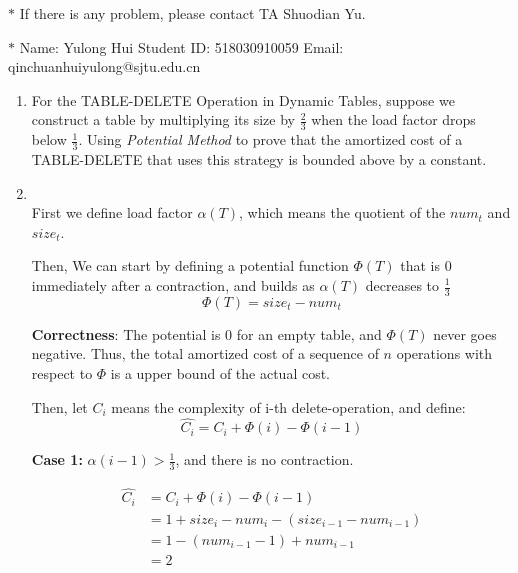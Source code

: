 \documentclass[12pt,a4paper]{article}
\makeatletter
\newtheorem*{solution}{Solution}
\theoremstyle{definition}
\renewenvironment{solution}[1][Solution] {\par\pushQED{\qed}\normalfont\topsep6\p@\@plus6\p@\relax\trivlist\item[\hskip\labelsep\bfseries#1\@addpunct{.}]\ignorespaces}{\popQED\endtrivlist\@endpefalse} \makeatother
\makeatother
\begin{document}
\noindent

\noindent{}
\begin{center}
\footnotesize{\color{red}$*$ If there is any problem, please contact TA Shuodian Yu. }

\footnotesize{\color{blue}$*$ Name: Yulong Hui  \quad Student ID: 518030910059 \quad Email: qinchuanhuiyulong@sjtu.edu.cn}
\end{center}
\begin{enumerate}
	\item For the TABLE-DELETE Operation in Dynamic Tables, suppose we construct a table by multiplying its size by $\frac 23$ when the load factor drops below $\frac 13$. Using \emph{Potential Method} to prove that the amortized cost of a TABLE-DELETE that uses this strategy is bounded above by a constant.
	
	\begin{solution}
		~\\
		First we define load factor $\alpha(T)$, which means the quotient of the $num_t$ and $size_t$.
		 
		Then, We can start by defining a potential function $\Phi(T) $ that is 0 immediately after a contraction, and builds as $\alpha(T) $ decreases to $\frac{1}{3} $
		$$\Phi(T)=size_t-num_t $$
		
		\textbf{Correctness}: The potential is 0 for an empty table, and $\Phi(T)$ never goes negative. Thus, the total amortized cost of a sequence of $n$ operations with respect to $\Phi$ is a upper bound of the actual cost.
		
		Then, let $ C_i $ means the complexity of i-th delete-operation, and define:
		$$ \widehat{C_i}=C_i+\Phi(i)-\Phi(i-1)$$
		
	   \textbf{Case 1:} $\alpha(i-1)>\frac{1}{3}$, and there is no contraction.
	     
		
		 \begin{equation}\nonumber
		 \begin{aligned}
		 \widehat{C_i}&=C_i+\Phi(i)-\Phi(i-1)
		 \\&=1+size_i-num_i-(size_{i-1}-num_{i-1})
		  \\&=1-(num_{i-1}-1)+num_{i-1}
		  \\&=2
		 \end{aligned}
		 \end{equation}
		 

\end{solution}
\end{enumerate}
\end{document}
